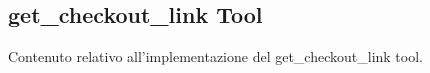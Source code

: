 \subsection{get\_checkout\_link Tool}

Contenuto relativo all'implementazione del get\_checkout\_link tool.
